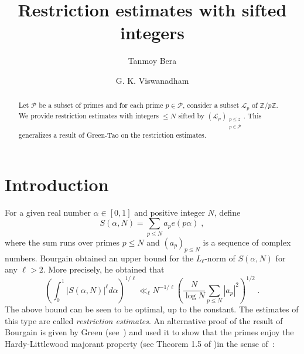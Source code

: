 \documentclass[12pt,article]{amsart}
\theoremstyle{remark}
\numberwithin{equation}{section}
\begin{document}
	
	\title[Restriction estimates with sifted integers]{Restriction estimates with sifted integers}
	
	\author{Tanmoy Bera}
	\address{$^{1}$Harish-Chandra Research Institute, Chhatnag Road, Jhunsi, Prayagraj, 211019 India\\
		$^{2}$Homi Bhabha National Institute, Training School Complex, Anushakti Nagar, Mumbai, 400094 India}
	\author{G. K. Viswanadham}
	\address{$^{3}$Department of Mathematical Sciences, IISER Berhampur, Ganjam, Odisha, India 760003}
	
	
	
	
	\begin{abstract}
		Let $\mathcal{P}$ be a subset of primes and for each prime $p\in \mathcal{P}$, consider a subset $\mathcal{L}_p$ of $\mathbb{Z}/p\mathbb{Z}$. We provide restriction estimates with integers $\leq N$ sifted by $(\mathcal{L}_p)_{\substack{p\leq z\\ p\in \mathcal{P}}}$. This generalizes a result of Green-Tao \cite{Green-Tao*06} on the restriction estimates. 
	\end{abstract}
	\maketitle
	\section{Introduction}
	For a given real number $\alpha\in [0,1]$ and positive integer $N$, define
	\begin{equation}
		\label{S-alpha,N}
		S(\alpha, N)=\sum_{p\leq N} a_p e(p\alpha)\; ,
	\end{equation}
	where the sum runs over  primes $p\leq N$ and $(a_p)_{p\leq N}$ is a sequence of complex numbers. Bourgain \cite{Bourgain*89} obtained an upper bound for the $L_{\ell}$-norm of $S(\alpha,N)$ for any $\ell>2$. More precisely, he obtained that
	\begin{equation}
		\label{restriction}
		\left(\int_{0}^1|S(\alpha,N)|^\ell d\alpha\right)^{1/\ell}\ll_{\ell}  N^{-1/\ell} \left(\frac{N}{\log N}\sum_{p\leq N}|a_p|^2\right)^{1/2}\; .
	\end{equation}
	The above bound can be seen to be optimal, up to the constant. The estimates of this type are called {\em restriction estimates}.  An alternative proof of the result of Bourgain \cite{Bourgain*89} is given by Green (see~\cite[Theorem~2.1]{Green*03}) and used it to show that the primes enjoy the Hardy-Littlewood majorant property (see Theorem 1.5 of \cite{Green*03})in the sense of~\cite{Green-Ruzsa 2004}:
	
\end{document}

